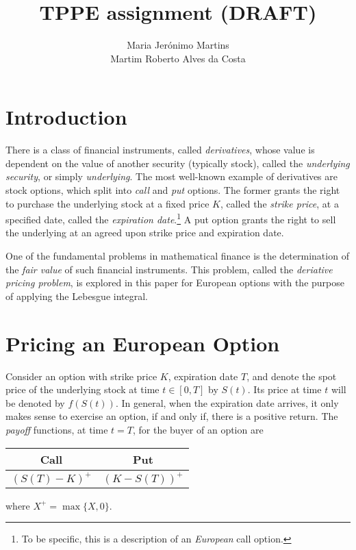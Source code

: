 \documentclass[]{article}
\title{TPPE assignment (DRAFT)}
\author{Maria Jerónimo Martins \\ Martim Roberto Alves da Costa}
\theoremstyle{definition}
\theoremstyle{remark}
\begin{document}
\maketitle

\section{Introduction}
There is a class of financial instruments, called \textit{derivatives}, whose value is dependent on the value of another security (typically stock), called the \textit{underlying security}, or simply \textit{underlying}. The most well-known example of derivatives are stock options, which split into \textit{call} and \textit{put} options. The former grants the right to purchase the underlying stock at a fixed price $K$, called the \textit{strike price}, at a specified date, called the \textit{expiration date}.\footnote{To be specific, this is a description of an \textit{European} call option.}
	A put option grants the right to sell the underlying at an agreed upon strike price and expiration date. 
	\par One of the fundamental problems in mathematical finance is the determination of the \textit{fair value} of such financial instruments. This problem, called the \textit{deriative pricing problem}, is explored in this paper for European options with the purpose of applying the Lebesgue integral.

\section{Pricing an European Option}
Consider an option with strike price $K$, expiration date $T$, and denote the spot price of the underlying stock at time $t \in [0, T]$ by $S(t)$. Its price at time $t$ will be denoted by $f(S(t))$. In general, when the expiration date arrives, it only makes sense to exercise an option, if and only if, there is a positive return. The \textit{payoff} functions, at time $t=T$, for the buyer of an option are
\begin{center}
	\begin{tabular}{|c|c|}
		\hline
		Call      & Put       \\ \hline
		$(S(T)-K)^+$ & $(K-S(T))^+$ \\ \hline
	\end{tabular}
\end{center}

where $X^+ = \max \{X,0\}$.
\end{document}
